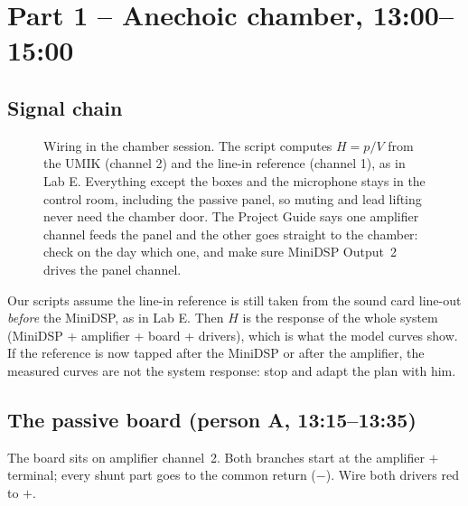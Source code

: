 \documentclass[a4paper,10pt]{article}
\begin{document}
\section{Part 1 -- Anechoic chamber, 13:00--15:00}

\subsection{Signal chain}
\begin{figure}[H]
\centering

\caption{Wiring in the chamber session. The script computes $H = p/V$ from the UMIK (channel 2) and the
line-in reference (channel 1), as in Lab E. Everything except the boxes and the microphone stays in the
control room, including the passive panel, so muting and lead lifting never need the chamber door. The
Project Guide says one amplifier channel feeds the panel and the other goes straight to the chamber:
check on the day which one, and make sure MiniDSP Output~2 drives the panel channel.}
\label{fig:chain}
\end{figure}

\begin{warnbox}
Our scripts assume the line-in reference is still taken from the sound card line-out \emph{before} the
MiniDSP, as in Lab E. Then $H$ is the response of the whole system (MiniDSP + amplifier + board +
drivers), which is what the model curves show. If the reference is now tapped after the MiniDSP or after
the amplifier, the measured curves are not the system response: stop and adapt the plan with him.
\end{warnbox}

\subsection{The passive board (person A, 13:15--13:35)}\label{sec:board}

The board sits on amplifier channel~2. Both branches start at the amplifier $+$ terminal; every shunt
part goes to the common return ($-$). Wire both drivers red to $+$.
\end{document}
